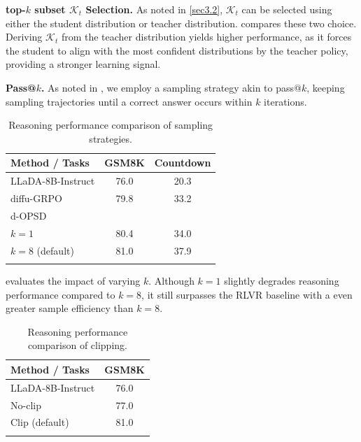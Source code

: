 \documentclass{article}
\begin{document}
\textbf{top-$k$ subset $\mathcal{K}_t$ Selection. } \label{sec4.4.3} As noted in \cref{sec3.2}, $\mathcal{K}_t$ can be selected using either the student distribution or teacher distribution.  compares these two choice. Deriving $\mathcal{K}_t$ from the teacher distribution yields higher performance, as it forces the student to align with the most confident distributions by the teacher policy, providing a stronger learning signal.

\textbf{Pass@$k$. } \label{sec4.4.4} As noted in , we employ a sampling strategy akin to pass@$k$, keeping sampling trajectories until a correct answer occurs within $k$ iterations. 

\begin{table}
\vspace{-20pt}
\setlength{\tabcolsep}{4pt}
\centering
\caption{Reasoning performance comparison of sampling strategies.}
\begin{tabular}{lcc}
\toprule
\textbf{Method / Tasks} & \textbf{GSM8K} & \textbf{Countdown} \\
\midrule
LLaDA-8B-Instruct & 76.0 & 20.3 \\
diffu-GRPO & 79.8 & 33.2 \\
d-OPSD \\
\quad $k=1$ & 80.4 & 34.0 \\
\quad $k=8$ (default) & \cellcolor{lightblue} 81.0 & \cellcolor{lightblue} 37.9 \\
\bottomrule
\label{tab8}
\end{tabular}
\vspace{-25pt}
\end{table}

 evaluates the impact of varying $k$. Although $k=1$ slightly degrades reasoning performance compared to $k=8$, it still surpasses the RLVR baseline with a even greater sample efficiency than $k=8$.

\begin{table}
\vspace{-20pt}
\setlength{\tabcolsep}{4pt}
\centering
\caption{Reasoning performance comparison of clipping.}
\begin{tabular}{lc}
\toprule
\textbf{Method / Tasks} & \textbf{GSM8K} \\
\midrule
LLaDA-8B-Instruct & 76.0 \\
No-clip & 77.0 \\
Clip (default) & \cellcolor{lightblue} 81.0 \\
\bottomrule
\label{app_tab3}
\end{tabular}
\vspace{-20pt}
\end{table}
\end{document}
